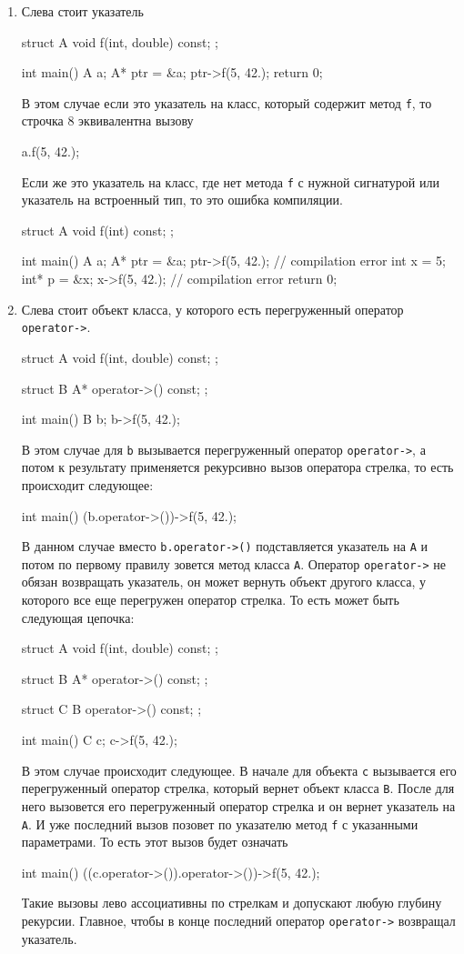 \begin{enumerate}
\item Слева стоит указатель
\begin{cppcode}
struct A {
  void f(int, double) const;
};

int main() {
  A a;
  A* ptr = &a;
  ptr->f(5, 42.);
  return 0;
}
\end{cppcode}
В этом случае если это указатель на класс, который содержит метод \verb"f", то строчка 8 эквивалентна вызову
\begin{cppcode}
a.f(5, 42.);
\end{cppcode}
Если же это указатель на класс, где нет метода \verb"f" с нужной сигнатурой или указатель на встроенный тип, то это ошибка компиляции.
\begin{cppcode}
struct A {
  void f(int) const;
};

int main() {
  A a;
  A* ptr = &a;
  ptr->f(5, 42.); // compilation error
  int x = 5;
  int* p = &x;
  x->f(5, 42.); // compilation error
  return 0;
}
\end{cppcode}

\item Слева стоит объект класса, у которого есть перегруженный оператор \verb"operator->".
\begin{cppcode}
struct A {
  void f(int, double) const;
};

struct B {
  A* operator->() const;
};

int main() {
  B b;
  b->f(5, 42.);
}
\end{cppcode}
В этом случае для \verb"b" вызывается перегруженный оператор \verb"operator->", а потом к результату применяется рекурсивно вызов оператора стрелка, то есть происходит следующее:
\begin{cppcode}
int main() {
  (b.operator->())->f(5, 42.);
}
\end{cppcode}
В данном случае вместо \verb"b.operator->()" подставляется указатель на \verb"A" и потом по первому правилу зовется метод класса \verb"A".
Оператор \verb"operator->" не обязан возвращать указатель, он может вернуть объект другого класса, у которого все еще перегружен оператор стрелка.
То есть может быть следующая цепочка:
\begin{cppcode}
struct A {
  void f(int, double) const;
};

struct B {
  A* operator->() const;
};

struct C {
  B operator->() const;
};

int main() {
  C c;
  c->f(5, 42.);
}
\end{cppcode}
В этом случае происходит следующее.
В начале для объекта \verb"c" вызывается его перегруженный оператор стрелка, который вернет объект класса \verb"B".
После для него вызовется его перегруженный оператор стрелка и он вернет указатель на \verb"A".
И уже последний вызов позовет по указателю метод \verb"f" с указанными параметрами.
То есть этот вызов будет означать
\begin{cppcode}
int main() {
  ((c.operator->()).operator->())->f(5, 42.);
}
\end{cppcode}
Такие вызовы лево ассоциативны по стрелкам и допускают любую глубину рекурсии.
Главное, чтобы в конце последний оператор \verb"operator->" возвращал указатель.


\end{enumerate}
